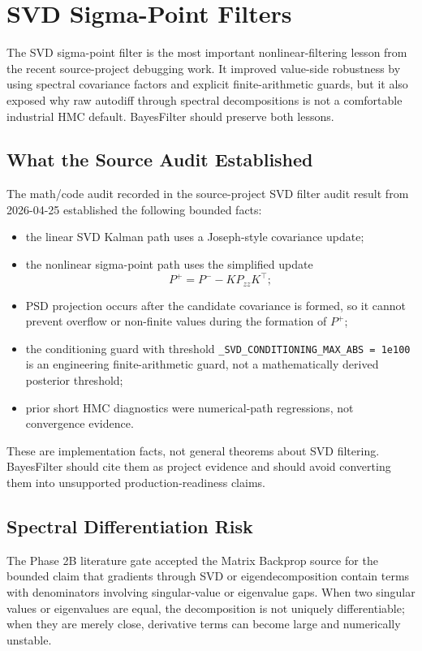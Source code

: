 \chapter{SVD Sigma-Point Filters}
\label{ch:bf-svd-sigma-point}

The SVD sigma-point filter is the most important nonlinear-filtering lesson
from the recent source-project debugging work.  It improved value-side
robustness by using spectral covariance factors and explicit finite-arithmetic
guards, but it also exposed why raw autodiff through spectral decompositions is
not a comfortable industrial HMC default.  BayesFilter should preserve both
lessons.

\section{What the Source Audit Established}
\label{sec:bf-svd-audit-established}

The math/code audit recorded in
the source-project SVD filter audit result from 2026-04-25
established the following bounded facts:
\begin{itemize}
  \item the linear SVD Kalman path uses a Joseph-style covariance update;
  \item the nonlinear sigma-point path uses the simplified update
    \[
      P^+ = P^- - K P_{zz} K^\top ;
    \]
  \item PSD projection occurs after the candidate covariance is formed, so it
    cannot prevent overflow or non-finite values during the formation of
    $P^+$;
  \item the conditioning guard with threshold
    \texttt{\_SVD\_CONDITIONING\_MAX\_ABS = 1e100} is an engineering
    finite-arithmetic guard, not a mathematically derived posterior threshold;
  \item prior short HMC diagnostics were numerical-path regressions, not
    convergence evidence.
\end{itemize}
These are implementation facts, not general theorems about SVD filtering.
BayesFilter should cite them as project evidence and should avoid converting
them into unsupported production-readiness claims.

\section{Spectral Differentiation Risk}
\label{sec:bf-svd-spectral-risk}

The Phase 2B literature gate accepted the Matrix Backprop source for the
bounded claim that gradients through SVD or eigendecomposition contain terms
with denominators involving singular-value or eigenvalue gaps.  When two
singular values or eigenvalues are equal, the decomposition is not uniquely
differentiable; when they are merely close, derivative terms can become large
and numerically unstable.

